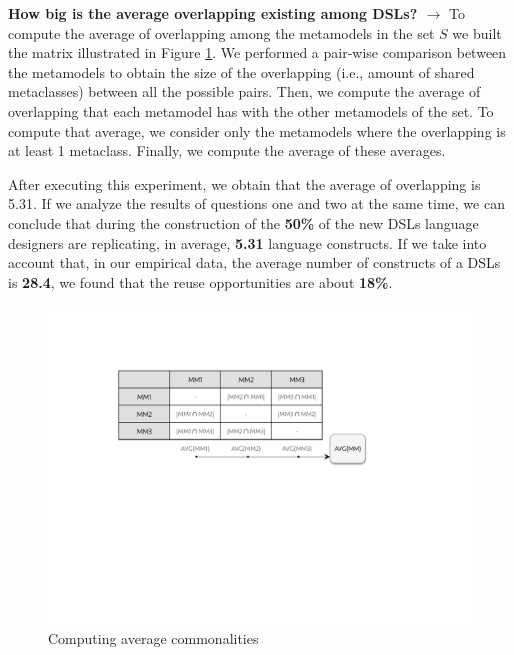 \textbf{How big is the average overlapping existing among DSLs? $\rightarrow$} To compute the average of overlapping among the metamodels in the set $S$ we built the matrix illustrated in Figure \ref{fig:matrix-evaluation}. We performed a pair-wise comparison between the metamodels to obtain the size of the overlapping (i.e., amount of shared metaclasses) between all the possible pairs. Then, we compute the average of overlapping that each metamodel has with the other metamodels of the set. To compute that average, we consider only the metamodels where the overlapping is at least 1 metaclass. Finally, we compute the average of these averages.

After executing this experiment, we obtain that the average of overlapping is 5.31. If we analyze the results of questions one and two at the same time, we can conclude that during the construction of the \textbf{50\%} of the new DSLs language designers are replicating, in average, \textbf{5.31} language constructs. If we take into account that, in our empirical data, the average number of constructs of a DSLs is \textbf{28.4}, we found that the reuse opportunities are about \textbf{18\%}. 

\begin{figure}[h!]
\centering
\includegraphics[width=0.75\linewidth]{images/matrix-evaluation.pdf}
\caption{Computing average commonalities}
\label{fig:matrix-evaluation}
\end{figure}



